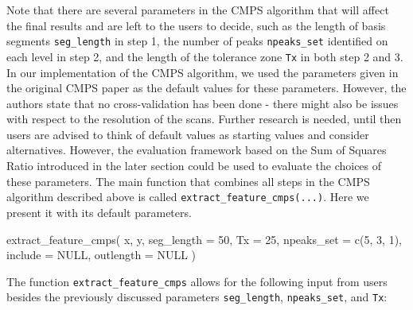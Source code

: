 Note that there are several parameters in the CMPS algorithm that will
affect the final results and are left to the users to decide, such as
the length of basis segments \texttt{seg\_length} in step 1, the number
of peaks \texttt{npeaks\_set} identified on each level in step 2, and
the length of the tolerance zone \texttt{Tx} in both step 2 and 3. In
our implementation of the CMPS algorithm, we used the parameters given
in the original CMPS paper \citep{cmps} as the default values for these
parameters. However, the authors state that no cross-validation has been
done - there might also be issues with respect to the resolution of the
scans. Further research is needed, until then users are advised to think
of default values as starting values and consider alternatives. However,
the evaluation framework based on the Sum of Squares Ratio introduced in
the later section could be used to evaluate the choices of these
parameters. The main function that combines all steps in the CMPS
algorithm described above is called
\texttt{extract\_feature\_cmps(...)}. Here we present it with its
default parameters.

\begin{Schunk}
\begin{Sinput}
extract_feature_cmps(
  x,
  y,
  seg_length = 50,
  Tx = 25,
  npeaks_set = c(5, 3, 1),
  include = NULL,
  outlength = NULL
)
\end{Sinput}
\end{Schunk}

The function \texttt{extract\_feature\_cmps} allows for the following
input from users besides the previously discussed parameters
\texttt{seg\_length}, \texttt{npeaks\_set}, and \texttt{Tx}:

